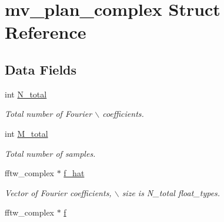 \hypertarget{structmv__plan__complex}{
\section{mv\_\-plan\_\-complex Struct Reference}
\label{structmv__plan__complex}
}
\subsection*{Data Fields}
\begin{CompactItemize}
\item 
\hypertarget{structmv__plan__complex_ba1bfcd7fc0fdbcb2b444fc3c538b82d}{
int \hyperlink{structmv__plan__complex_ba1bfcd7fc0fdbcb2b444fc3c538b82d}{N\_\-total}}
\label{structmv__plan__complex_ba1bfcd7fc0fdbcb2b444fc3c538b82d}

\begin{CompactList}\small\item\em Total number of Fourier $\backslash$ coefficients. \item\end{CompactList}\item 
\hypertarget{structmv__plan__complex_b54e0bc1fcd6256b80fb869a259ae913}{
int \hyperlink{structmv__plan__complex_b54e0bc1fcd6256b80fb869a259ae913}{M\_\-total}}
\label{structmv__plan__complex_b54e0bc1fcd6256b80fb869a259ae913}

\begin{CompactList}\small\item\em Total number of samples. \item\end{CompactList}\item 
\hypertarget{structmv__plan__complex_1eb39061f5352aee96a545992e2bed2f}{
fftw\_\-complex $\ast$ \hyperlink{structmv__plan__complex_1eb39061f5352aee96a545992e2bed2f}{f\_\-hat}}
\label{structmv__plan__complex_1eb39061f5352aee96a545992e2bed2f}

\begin{CompactList}\small\item\em Vector of Fourier coefficients, $\backslash$ size is N\_\-total float\_\-types. \item\end{CompactList}\item 
\hypertarget{structmv__plan__complex_9a68f175900236a3f6c188596e22f7b6}{
fftw\_\-complex $\ast$ \hyperlink{structmv__plan__complex_9a68f175900236a3f6c188596e22f7b6}{f}}
\label{structmv__plan__complex_9a68f175900236a3f6c188596e22f7b6}


\end{CompactItemize}
